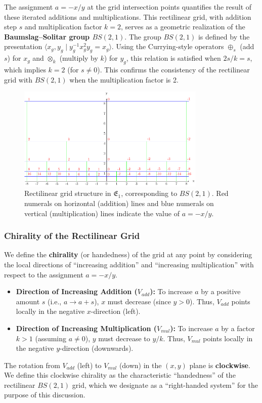 The assignment $a = -x/y$ at the grid intersection points quantifies the result of these iterated additions and multiplications. This rectilinear grid, with addition step $s$ and multiplication factor $k=2$, serves as a geometric realization of the \textbf{Baumslag--Solitar group $BS(2,1)$}. The group $BS(2,1)$ is defined by the presentation $\langle x_g, y_g \mid y_g^{-1}x_g^2y_g = x_g \rangle$. Using the Currying-style operators $\oplus_s$ (add $s$) for $x_g$ and $\otimes_k$ (multiply by $k$) for $y_g$, this relation is satisfied when $2s/k = s$, which implies $k=2$ (for $s \neq 0$). This confirms the consistency of the rectilinear grid with $BS(2,1)$ when the multiplication factor is 2.

\begin{figure}[ht]
\centering
\includegraphics[width=0.8\textwidth]{images/01-grid-example-1.pdf}
\caption{Rectilinear grid structure in $\mathfrak{E}_1$, corresponding to $BS(2,1)$. Red numerals on horizontal (addition) lines and blue numerals on vertical (multiplication) lines indicate the value of $a=-x/y$.}\label{fig:grid1_revised}
\end{figure}

\subsubsection{Chirality of the Rectilinear Grid}
We define the \textbf{chirality} (or handedness) of the grid at any point by considering the local directions of ``increasing addition'' and ``increasing multiplication'' with respect to the assignment $a=-x/y$.
\begin{itemize}
    \item \textbf{Direction of Increasing Addition ($V_{add}$):} To increase $a$ by a positive amount $s$ (i.e., $a \to a+s$), $x$ must decrease (since $y>0$). Thus, $V_{add}$ points locally in the negative $x$-direction (left).
    \item \textbf{Direction of Increasing Multiplication ($V_{mul}$):} To increase $a$ by a factor $k>1$ (assuming $a \neq 0$), $y$ must decrease to $y/k$. Thus, $V_{mul}$ points locally in the negative $y$-direction (downwards).
\end{itemize}
The rotation from $V_{add}$ (left) to $V_{mul}$ (down) in the $(x,y)$ plane is \textbf{clockwise}. We define this clockwise chirality as the characteristic ``handedness'' of the rectilinear $BS(2,1)$ grid, which we designate as a ``right-handed system'' for the purpose of this discussion.

